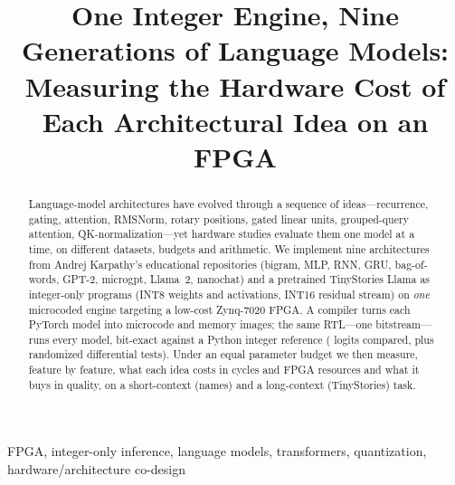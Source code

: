 \documentclass[conference]{IEEEtran}
\begin{document}
\title{One Integer Engine, Nine Generations of Language Models:\\
Measuring the Hardware Cost of Each Architectural Idea on an FPGA}

\author{
}

\maketitle

\begin{abstract}
Language-model architectures have evolved through a sequence of ideas---recurrence, gating, attention, RMSNorm, rotary
positions, gated linear units, grouped-query attention, QK-normalization---yet hardware studies evaluate them one model at a
time, on different datasets, budgets and arithmetic. We implement nine architectures from Andrej Karpathy's educational
repositories (bigram, MLP, RNN, GRU, bag-of-words, GPT-2, microgpt, Llama~2, nanochat) and a pretrained TinyStories Llama
as integer-only programs (INT8 weights and activations, INT16 residual stream) on \emph{one} microcoded engine targeting a
low-cost Zynq-7020 FPGA. A compiler turns each PyTorch model into microcode and memory images; the same RTL---one
bitstream---runs every model, bit-exact against a Python integer reference (\zooVerifiedLogits{} logits compared, plus
\zooFuzzCases{} randomized differential tests). Under an equal parameter budget we then measure, feature by feature, what
each idea costs in cycles and FPGA resources and what it buys in quality, on a short-context (names) and a long-context
(TinyStories) task. \zooAbstractFinding{}
\end{abstract}

\begin{IEEEkeywords}
FPGA, integer-only inference, language models, transformers, quantization, hardware/architecture co-design
\end{IEEEkeywords}

\end{document}

